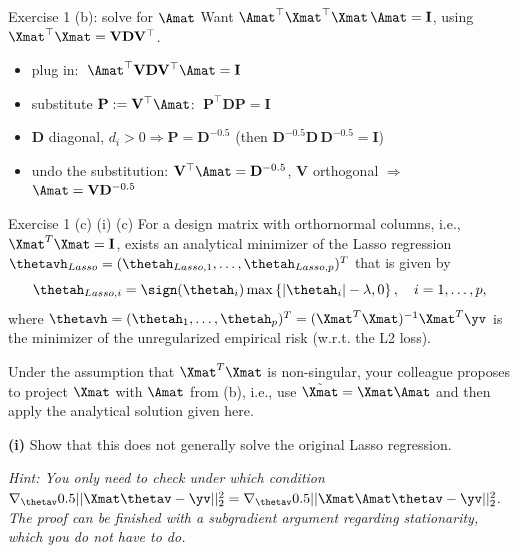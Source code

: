 \documentclass[aspectratio=169]{beamer}
\newcommand{\Imat}{\mathbf{I}}
\newcommand{\Vmat}{\mathbf{V}}
\newcommand{\Dmat}{\mathbf{D}}
\newcommand{\Pmat}{\mathbf{P}}
\begin{document}
\begin{frame}{Exercise 1 (b): solve for $\Amat$}
	Want $\Amat^\top \Xmat^\top\Xmat\, \Amat = \Imat$, using $\Xmat^\top\Xmat = \Vmat\Dmat\Vmat^\top$.
	\medskip
	\begin{itemize}
		\item<2-> plug in: $\;\Amat^\top \Vmat\Dmat\Vmat^\top \Amat = \Imat$
		\item<3-> substitute $\Pmat := \Vmat^\top\Amat$: $\;\Pmat^\top\Dmat\Pmat = \Imat$
		\item<4-> $\Dmat$ diagonal, $d_i>0 \Rightarrow \Pmat = \Dmat^{-0.5}$ \quad (then $\Dmat^{-0.5}\Dmat\,\Dmat^{-0.5}=\Imat$)
		\item<5-> undo the substitution: $\Vmat^\top\Amat = \Dmat^{-0.5}$, $\Vmat$ orthogonal $\Rightarrow$ \colorbox{blue!10}{$\Amat = \Vmat\Dmat^{-0.5}$}
	\end{itemize}
\end{frame}

\begin{frame}{Exercise 1 (c) (i)}
	(c) For a design matrix with orthornormal columns, i.e., $\Xmat^T \Xmat = \Imat$, exists an analytical minimizer of the Lasso regression $\thetavh_{Lasso} = (\thetah_{Lasso, 1}, \ldots, \thetah_{Lasso, p})^T$ that is given by 
	$$\thetah_{Lasso, i} = \sign(\thetah_{i}) \max \left\{ \left|\thetah_i \right|  - \lambda, 0   \right\}, \quad i = 1, \ldots, p,$$
	where $\thetavh = (\thetah_1, \ldots, \thetah_p)^T = (\Xmat^T \Xmat)^{-1} \Xmat^T \yv$ is the minimizer of the unregularized empirical risk (w.r.t. the L2 loss).
	
	Under the assumption that $\Xmat^T\Xmat$ is non-singular, your colleague proposes to project $\Xmat$ with $\Amat$ from (b), i.e., use $\tilde{\Xmat} = \Xmat \Amat$ and then apply the analytical solution given here. 
	\vspace{10pt}
	
	\textbf{(i)} Show that this does not generally solve the original Lasso regression.
	 
	\vspace{10pt} 
	\emph{Hint: You only need to check under which condition $\nabla_{\thetav} 0.5 || \Xmat \thetav - \yv||_2^2 = \nabla_{\thetav} 0.5 ||\Xmat \Amat \thetav - \yv||_2^2 $. The proof can be finished with a subgradient argument regarding stationarity, which you do not have to do.}
\end{frame}
\end{document}
